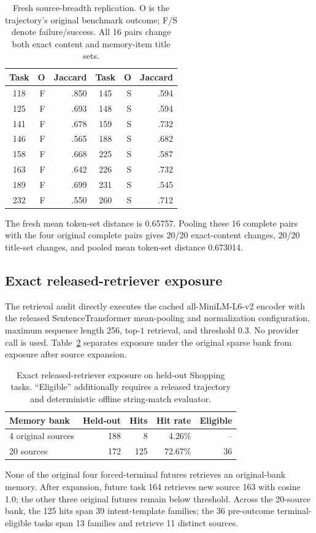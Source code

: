 \begin{table}[h]
\centering
\scriptsize
\caption{Fresh source-breadth replication. O is the trajectory's original benchmark outcome; F/S denote failure/success. All 16 pairs change both exact content and memory-item title sets.}
\label{tab:b2-breadth}
\begin{tabular}{crr@{\qquad}crr}
\toprule
Task & O & Jaccard & Task & O & Jaccard \\
\midrule
118 & F & .850 & 145 & S & .594 \\
125 & F & .693 & 148 & S & .594 \\
141 & F & .678 & 159 & S & .732 \\
146 & F & .565 & 188 & S & .682 \\
158 & F & .668 & 225 & S & .587 \\
163 & F & .642 & 226 & S & .732 \\
189 & F & .699 & 231 & S & .545 \\
232 & F & .550 & 260 & S & .712 \\
\bottomrule
\end{tabular}
\end{table}
The fresh mean token-set distance is 0.65757. Pooling these 16 complete pairs with the four original complete pairs gives 20/20 exact-content changes, 20/20 title-set changes, and pooled mean token-set distance 0.673014.

\subsection{Exact released-retriever exposure}
The retrieval audit directly executes the cached all-MiniLM-L6-v2 encoder with the released SentenceTransformer mean-pooling and normalization configuration, maximum sequence length 256, top-$1$ retrieval, and threshold 0.3. No provider call is used. Table~\ref{tab:retrieval-audit} separates exposure under the original sparse bank from exposure after source expansion.

\begin{table}[h]
\centering
\small
\caption{Exact released-retriever exposure on held-out Shopping tasks. ``Eligible'' additionally requires a released trajectory and deterministic offline string-match evaluator.}
\label{tab:retrieval-audit}
\begin{tabular}{lrrrr}
\toprule
Memory bank & Held-out & Hits & Hit rate & Eligible \\
\midrule
4 original sources & 188 & 8 & 4.26\% & -- \\
20 sources & 172 & 125 & 72.67\% & 36 \\
\bottomrule
\end{tabular}
\end{table}
None of the original four forced-terminal futures retrieves an original-bank memory. After expansion, future task 164 retrieves new source 163 with cosine 1.0; the other three original futures remain below threshold. Across the 20-source bank, the 125 hits span 39 intent-template families; the 36 pre-outcome terminal-eligible tasks span 13 families and retrieve 11 distinct sources.


